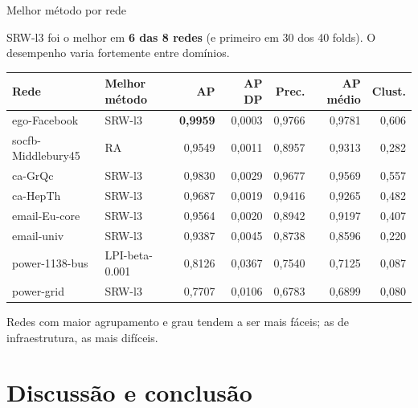 \documentclass[aspectratio=169,11pt]{beamer}
\providecommand{\EspacoAposTitulo}{\vspace*{0.93cm}}
\newcommand{\dest}[1]{\textcolor{modTeal}{\textbf{#1}}}
\begin{document}
\begin{frame}[t]{Melhor método por rede}

  \EspacoAposTitulo

  SRW-l3 foi o melhor em \dest{6 das 8 redes} (e primeiro em 30 dos 40 folds).
  O desempenho varia fortemente entre domínios.

  \vspace{0.14cm}
  {\footnotesize
  \setlength{\tabcolsep}{6pt}
  \renewcommand{\arraystretch}{1.02}
  \begin{center}
  \begin{tabular}{llrrrrr}
    \toprule
    \textbf{Rede} & \textbf{Melhor método} &
    \textbf{AP} & \textbf{AP DP} & \textbf{Prec.} &
    \textbf{AP médio} & \textbf{Clust.} \\
    \midrule
    ego-Facebook       & SRW-l3          & \textbf{0,9959} & 0,0003 & 0,9766 & 0,9781 & 0,606 \\
    socfb-Middlebury45 & RA              & 0,9549 & 0,0011 & 0,8957 & 0,9313 & 0,282 \\
    ca-GrQc            & SRW-l3          & 0,9830 & 0,0029 & 0,9677 & 0,9569 & 0,557 \\
    ca-HepTh           & SRW-l3          & 0,9687 & 0,0019 & 0,9416 & 0,9265 & 0,482 \\
    email-Eu-core      & SRW-l3          & 0,9564 & 0,0020 & 0,8942 & 0,9197 & 0,407 \\
    email-univ         & SRW-l3          & 0,9387 & 0,0045 & 0,8738 & 0,8596 & 0,220 \\
    power-1138-bus     & LPI-beta-0.001  & 0,8126 & 0,0367 & 0,7540 & 0,7125 & 0,087 \\
    power-grid         & SRW-l3          & 0,7707 & 0,0106 & 0,6783 & 0,6899 & 0,080 \\
    \bottomrule
  \end{tabular}
  \end{center}}

  \vspace{0.10cm}
  {\scriptsize Redes com maior agrupamento e grau tendem a ser mais
  fáceis; as de infraestrutura, as mais difíceis.}

\end{frame}

\section{Discussão e conclusão}
\end{document}
